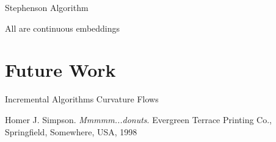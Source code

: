 \documentclass[a4paper,UKenglish]{lipics}
\begin{document}
  Stephenson Algorithm
  
  All are continuous embeddings


\section{Future Work} %
\label{sec:future_work}

  Incremental Algorithms
  Curvature Flows



%


\nocite{Simpson}

\begin{thebibliography}{50}
 Homer J. Simpson. \textsl{Mmmmm...donuts}. Evergreen Terrace Printing Co., Springfield, Somewhere, USA, 1998
\end{thebibliography}
\end{document}

